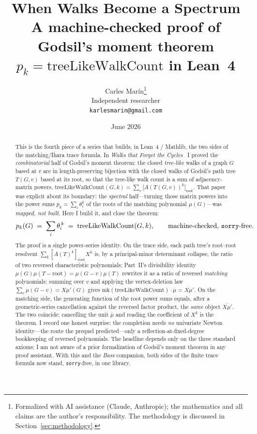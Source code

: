 \documentclass[11pt]{article}
\title{\bf When Walks Become a Spectrum\\[4pt]
  \large\normalfont A machine-checked proof of Godsil's moment theorem
  $p_k=\mathrm{treeLikeWalkCount}$ in Lean~4}
\author{Carles Mar\'in\thanks{Formalized with AI assistance (Claude, Anthropic); the mathematics
and all claims are the author's responsibility. The methodology is discussed in
Section~\ref{sec:methodology}.}\\[3pt]
  \normalsize Independent researcher\\
  \normalsize \texttt{karlesmarin@gmail.com}}
\date{June 2026}
\newcommand{\lean}[1]{{\def\_{\textunderscore\allowbreak}\texttt{#1}}}
\begin{document}
\maketitle

\begin{abstract}
This is the fourth piece of a series that builds, in Lean~4 / Mathlib, the two sides of the
matching/Ihara trace formula. In \emph{Walks that Forget the Cycles}~\cite{PartIII} I proved the
\emph{combinatorial} half of Godsil's moment theorem: the closed \emph{tree-like} walks of a graph
$G$ based at $v$ are in length-preserving bijection with the closed walks of Godsil's path tree
$T(G,v)$ based at its root, so that the tree-like walk count is a sum of adjacency-matrix powers,
$\mathrm{treeLikeWalkCount}(G,k)=\sum_v\bigl[A(T(G,v))^k\bigr]_{\mathrm{root}}$. That paper was
explicit about its boundary: the \emph{spectral} half---turning those matrix powers into the power
sums $p_k=\sum_i\theta_i^k$ of the roots of the matching polynomial $\mu(G)$---was \emph{mapped, not
built}. Here I build it, and close the theorem:
\[
  p_k(G)\;=\;\sum_i\theta_i^{\,k}\;=\;\mathrm{treeLikeWalkCount}(G,k),
  \qquad\text{machine-checked, \lean{sorry}-free.}
\]
The proof is a single power-series identity. On the trace side, each path tree's root--root resolvent
$\sum_k[A(T)^k]_{\mathrm{root}}X^k$ is, by a principal-minor determinant collapse, the ratio of two
reversed characteristic polynomials; Part~II's divisibility identity
$\mu(G)\mu(T-\mathrm{root})=\mu(G-v)\mu(T)$ rewrites it as a ratio of reversed \emph{matching}
polynomials; summing over $v$ and applying the vertex-deletion law $\sum_v\mu(G-v)=X\mu'(G)$ gives
$\mathrm{mk}(\mathrm{treeLikeWalkCount})\cdot\overline{\mu}=\overline{X\mu'}$. On the matching side, the
generating function of the root power sums equals, after a geometric-series cancellation against the
reversed factor product, the \emph{same} object $\overline{X\mu'}$. The two coincide; cancelling the
unit $\overline{\mu}$ and reading the coefficient of $X^k$ is the theorem. I record one honest
surprise: the completion needs \emph{no} univariate Newton identity---the route the prequel
predicted---only a reflection-at-fixed-degree bookkeeping of reversed polynomials. The headline
depends only on the three standard axioms; I am not aware of a prior formalization of Godsil's moment
theorem in any proof assistant. With this and the \emph{Bass} companion, both sides of the finite
trace formula now stand, \lean{sorry}-free, in one library.
\end{abstract}
\end{document}
